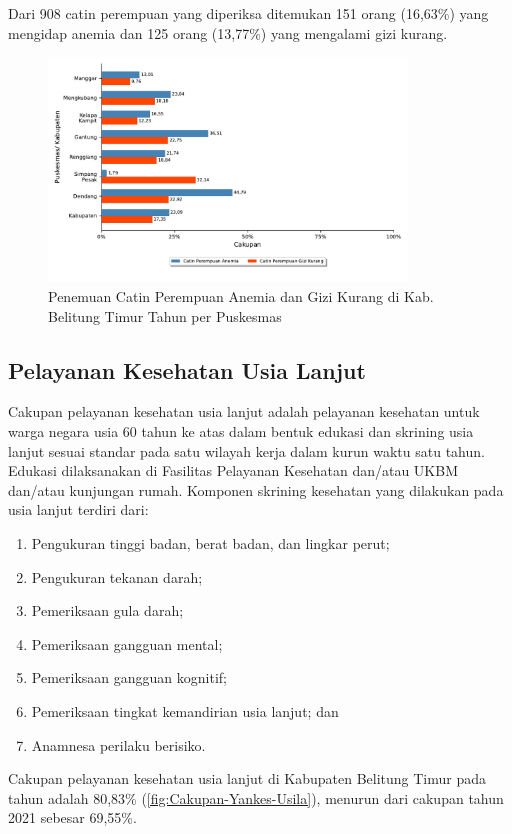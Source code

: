 Dari 908 catin perempuan yang diperiksa ditemukan 151 orang (16,63\%) yang mengidap anemia dan 125 orang (13,77\%) yang mengalami gizi kurang.

\begin{figure}[H]
	\centering
	\includegraphics[width=0.85\textwidth]{bab_05/bab_05_29b_catinResiko}
	\caption{Penemuan Catin Perempuan Anemia dan Gizi Kurang di Kab. Belitung Timur Tahun \tP per Puskesmas}
	\label{fig:Cakupan-Yankes-Catin-Anemia}
\end{figure}

\subsection{Pelayanan Kesehatan Usia Lanjut}
Cakupan pelayanan kesehatan usia lanjut adalah pelayanan kesehatan untuk warga negara usia 60 tahun ke atas dalam bentuk edukasi dan skrining usia
lanjut sesuai standar pada satu wilayah kerja dalam kurun waktu satu tahun. Edukasi dilaksanakan di Fasilitas Pelayanan Kesehatan dan/atau UKBM dan/atau kunjungan rumah. Komponen skrining kesehatan yang dilakukan pada usia lanjut terdiri dari:
\begin{enumerate}
  \item Pengukuran tinggi badan, berat badan, dan lingkar perut;
  \item Pengukuran tekanan darah;
  \item Pemeriksaan gula darah;
  \item Pemeriksaan gangguan mental;
  \item Pemeriksaan gangguan kognitif;
  \item Pemeriksaan tingkat kemandirian usia lanjut; dan
  \item Anamnesa perilaku berisiko.
\end{enumerate}

Cakupan pelayanan kesehatan usia lanjut di Kabupaten Belitung Timur pada tahun \tP adalah 80,83\% (\autoref{fig:Cakupan-Yankes-Usila}), menurun dari cakupan tahun 2021 sebesar 69,55\%.

